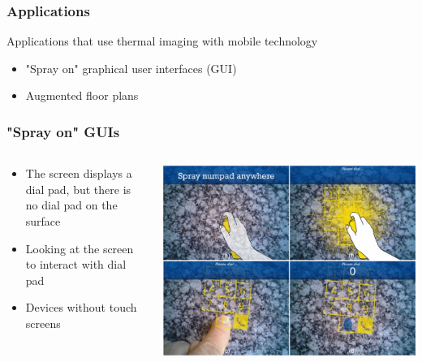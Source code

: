 \documentclass{beamer}
\begin{document}
\begin{frame}
	\frametitle{Applications}
	Applications that use thermal imaging with mobile technology 
	\begin{itemize}
		\item "Spray on" graphical user interfaces (GUI)
		\item Augmented floor plans
	\end{itemize}
\end{frame}

\begin{frame}
	\frametitle{"Spray on" GUIs}	
	\begin{columns}
	\begin{column}{0.45\textwidth}
	\begin{itemize}
		\item The screen displays a dial pad, but there is no dial pad on the surface
		\item Looking at the screen to interact with dial pad
		\item Devices without touch screens
	\end{itemize}		
	\end{column}
	\begin{column}{0.55\textwidth}
	\includegraphics[width=\textwidth]{../Sample_paper/images/numpad}
	\end{column}
	\end{columns}
\end{frame}
\end{document}
